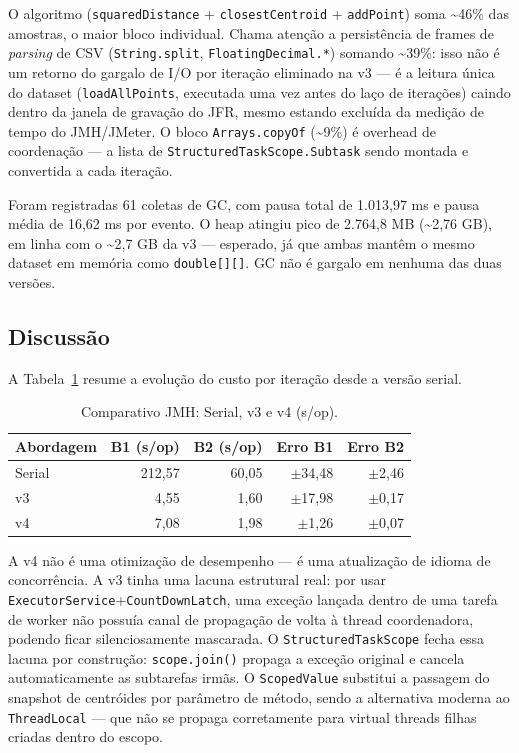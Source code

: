O algoritmo (\texttt{squaredDistance} + \texttt{closestCentroid} +
\texttt{addPoint}) soma \textasciitilde46\% das amostras, o maior bloco
individual. Chama atenção a persistência de frames de \textit{parsing}
de CSV (\texttt{String.split}, \texttt{FloatingDecimal.*}) somando
\textasciitilde39\%: isso não é um retorno do gargalo de I/O por
iteração eliminado na v3 --- é a leitura única do dataset
(\texttt{loadAllPoints}, executada uma vez antes do laço de iterações)
caindo dentro da janela de gravação do JFR, mesmo estando excluída da
medição de tempo do JMH/JMeter. O bloco \texttt{Arrays.copyOf}
(\textasciitilde9\%) é overhead de coordenação --- a lista de
\texttt{StructuredTaskScope.Subtask} sendo montada e convertida a cada
iteração.

Foram registradas 61 coletas de GC, com pausa total de 1.013,97 ms e
pausa média de 16,62 ms por evento. O heap atingiu pico de 2.764,8 MB
(\textasciitilde2,76 GB), em linha com o \textasciitilde2,7 GB da v3 ---
esperado, já que ambas mantêm o mesmo dataset em memória como
\texttt{double[][]}. GC não é gargalo em nenhuma das duas versões.

\subsection{Discussão}

A Tabela~\ref{tab:jmh-comparativo-v4} resume a evolução do custo por
iteração desde a versão serial.

\begin{table}[H]
\centering
\begin{tabular}{lrrrr}
\hline
\textbf{Abordagem} & \textbf{B1 (s/op)} & \textbf{B2 (s/op)} & \textbf{Erro B1} & \textbf{Erro B2} \\
\hline
Serial & 212{,}57 & 60{,}05 & $\pm$34{,}48 & $\pm$2{,}46 \\
v3     &   4{,}55 &  1{,}60 & $\pm$17{,}98 & $\pm$0{,}17 \\
v4     &   7{,}08 &  1{,}98 &  $\pm$1{,}26 & $\pm$0{,}07 \\
\hline
\end{tabular}
\caption{Comparativo JMH: Serial, v3 e v4 (s/op).}
\label{tab:jmh-comparativo-v4}
\end{table}

A v4 não é uma otimização de desempenho --- é uma atualização de idioma
de concorrência. A v3 tinha uma lacuna estrutural real: por usar
\texttt{ExecutorService}+\texttt{CountDownLatch}, uma exceção lançada
dentro de uma tarefa de worker não possuía canal de propagação de volta
à thread coordenadora, podendo ficar silenciosamente mascarada. O
\texttt{StructuredTaskScope} fecha essa lacuna por construção:
\texttt{scope.join()} propaga a exceção original e cancela
automaticamente as subtarefas irmãs. O \texttt{ScopedValue} substitui a
passagem do snapshot de centróides por parâmetro de método, sendo a
alternativa moderna ao \texttt{ThreadLocal} --- que não se propaga
corretamente para virtual threads filhas criadas dentro do escopo.

